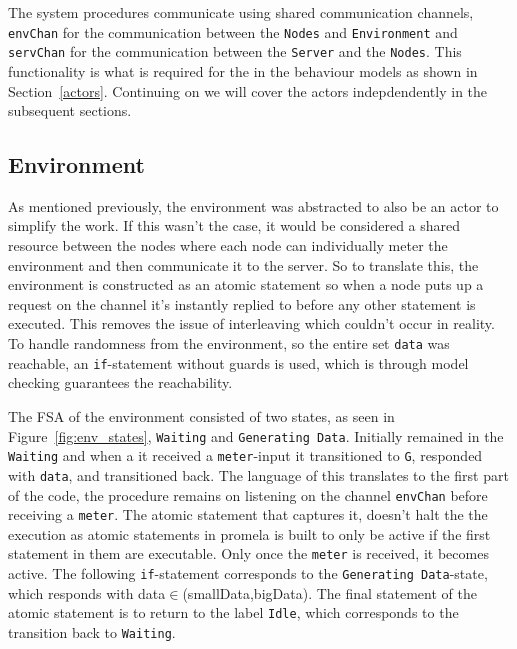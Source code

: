 The system procedures communicate using shared communication channels, \texttt{envChan} for the communication between the \texttt{Nodes} and \texttt{Environment} and \texttt{servChan} for the communication between the \texttt{Server} and the \texttt{Nodes}. This functionality is what is required for the in the behaviour models as shown in Section~\ref{actors}. Continuing on we will cover the actors indepdendently in the subsequent sections.

\subsection{Environment}

As mentioned previously, the environment was abstracted to also be an actor to simplify the work. If this wasn't the case, it would be considered a shared resource between the nodes where each node can individually meter the environment and then communicate it to the server. So to translate this, the environment is constructed as an atomic statement so when a node puts up a request on the channel it's instantly replied to before any other statement is executed. This removes the issue of interleaving which couldn't occur in reality. To handle randomness from the environment, so the entire set \texttt{data} was reachable, an \texttt{if}-statement without guards is used, which is through model checking guarantees the reachability. 


The FSA of the environment consisted of two states, as seen in Figure~\ref{fig:env_states}, \texttt{Waiting} and \texttt{Generating Data}. Initially remained in the \texttt{Waiting} and when a it received a \texttt{meter}-input it transitioned to \texttt{G}, responded with \texttt{data}, and transitioned back. The language of this translates to the first part of the code, the procedure remains on listening on the channel \texttt{envChan} before receiving a \texttt{meter}. The atomic statement that captures it, doesn't halt the the execution as atomic statements in promela is built to only be active if the first statement in them are executable. Only once the \texttt{meter} is received, it becomes active. The following \texttt{if}-statement corresponds to the \texttt{Generating Data}-state, which responds with data$\in$(smallData,bigData). The final statement of the atomic statement is to return to the label \texttt{Idle}, which corresponds to the transition back to \texttt{Waiting}.

